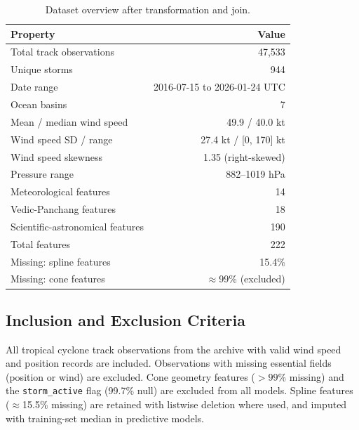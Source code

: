 \documentclass[12pt,a4paper]{article}
\begin{document}
\begin{table}[H]
  \centering
  \caption{Dataset overview after transformation and join.}
  \label{tab:dataset}
  \begin{tabular}{lr}
    \toprule
    \textbf{Property} & \textbf{Value} \\
    \midrule
    Total track observations            & 47{,}533 \\
    Unique storms                       & 944 \\
    Date range                          & 2016-07-15 to 2026-01-24 UTC \\
    Ocean basins                        & 7 \\
    Mean / median wind speed            & 49.9 / 40.0 kt \\
    Wind speed SD / range               & 27.4 kt / [0, 170] kt \\
    Wind speed skewness                 & 1.35 (right-skewed) \\
    Pressure range                      & 882--1019 hPa \\
    Meteorological features             & 14 \\
    Vedic-Panchang features             & 18 \\
    Scientific-astronomical features    & 190 \\
    Total features                      & 222 \\
    Missing: spline features            & 15.4\% \\
    Missing: cone features              & $\approx$99\% (excluded) \\
    \bottomrule
  \end{tabular}
\end{table}

\subsection{Inclusion and Exclusion Criteria}

All tropical cyclone track observations from the archive with valid wind speed
and position records are included. Observations with missing essential fields
(position or wind) are excluded. Cone geometry features ($>99\%$ missing) and
the \texttt{storm\_active} flag (99.7\% null) are excluded from all models.
Spline features ($\approx$15.5\% missing) are retained with listwise deletion
where used, and imputed with training-set median in predictive models.

\end{document}
